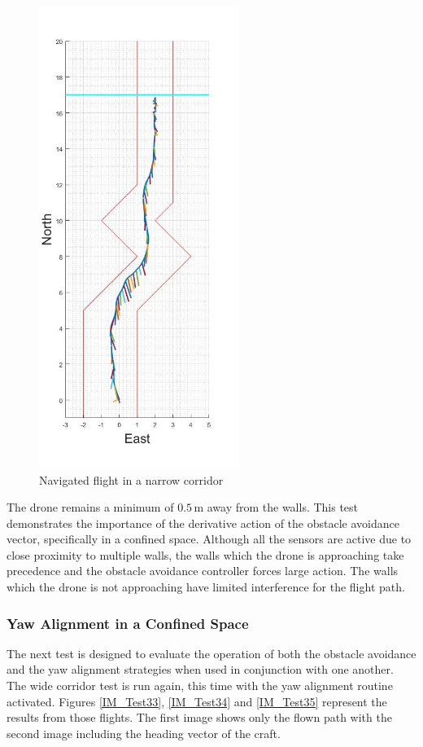 			\begin{figure}[H]
				\centering
				\includegraphics[height = 15cm]{../References/Testing/NarrowCorridor3DProx.jpg}     
				\caption{Navigated flight in a narrow corridor}
				\label{IM_Test32}
			\end{figure}
			
			The drone remains a minimum of $0.5$\,m away from the walls. This test demonstrates the importance of the derivative action of the obstacle avoidance vector, specifically in a confined space. Although all the sensors are active due to close proximity to multiple walls, the walls which the drone is approaching take precedence and the obstacle avoidance controller forces large action. The walls which the drone is not approaching have limited interference for the flight path.
			
			\subsubsection{Yaw Alignment in a Confined Space}
			The next test is designed to evaluate the operation of both the obstacle avoidance and the yaw alignment strategies when used in conjunction with one another. The wide corridor test is run again, this time with the yaw alignment routine activated. Figures \ref{IM_Test33}, \ref{IM_Test34} and \ref{IM_Test35} represent the results from those flights. The first image shows only the flown path with the second image including the heading vector of the craft.
			
